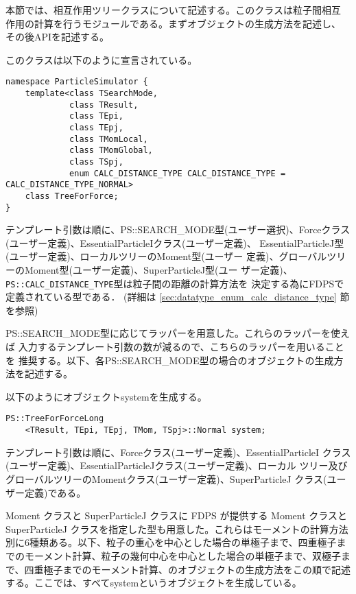 本節では、相互作用ツリークラスについて記述する。このクラスは粒子間相互
作用の計算を行うモジュールである。まずオブジェクトの生成方法を記述し、
その後APIを記述する。

\label{sec:module_standard_treeforce_object}
このクラスは以下のように宣言されている。
\begin{lstlisting}[caption=TreeForForce0]
namespace ParticleSimulator {
    template<class TSearchMode,
             class TResult,
             class TEpi,
             class TEpj,
             class TMomLocal,
             class TMomGlobal,
             class TSpj,
             enum CALC_DISTANCE_TYPE CALC_DISTANCE_TYPE = CALC_DISTANCE_TYPE_NORMAL>
    class TreeForForce;
}
\end{lstlisting}

テンプレート引数は順に、PS::SEARCH\_MODE型(ユーザー選択)、Forceクラス
(ユーザー定義)、EssentialParticleIクラス(ユーザー定義)、
EssentialParticleJ型(ユーザー定義)、ローカルツリーのMoment型(ユーザー
定義)、グローバルツリーのMoment型(ユーザー定義)、SuperParticleJ型(ユー
ザー定義)、{\tt PS::CALC\_DISTANCE\_TYPE}型は粒子間の距離の計算方法を
決定する為にFDPSで定義されている型である．
(詳細は \ref{sec:datatype_enum_calc_distance_type} 節を参照)

PS::SEARCH\_MODE型に応じてラッパーを用意した。これらのラッパーを使えば
入力するテンプレート引数の数が減るので、こちらのラッパーを用いることを
推奨する。以下、各PS::SEARCH\_MODE型の場合のオブジェクトの生成方法を記述する。

\label{sec:module_treeforce_standard_search_mode_long}

以下のようにオブジェクトsystemを生成する。
\begin{screen}
\begin{verbatim}
PS::TreeForForceLong
    <TResult, TEpi, TEpj, TMom, TSpj>::Normal system;
\end{verbatim}
\end{screen}
テンプレート引数は順に、Forceクラス(ユーザー定義)、EssentialParticleI
クラス(ユーザー定義)、EssentialParticleJクラス(ユーザー定義)、ローカル
ツリー及びグローバルツリーのMomentクラス(ユーザー定義)、SuperParticleJ
クラス(ユーザー定義)である。

Moment クラスと SuperParticleJ クラスに FDPS が提供する Moment クラスと SuperParticleJ クラスを指定した型も用意した。これらはモーメントの計算方法別に6種類ある。以下、粒子の重心を中心とした場合の単極子まで、四重極子までのモーメント計算、粒子の幾何中心を中心とした場合の単極子まで、双極子まで、四重極子までのモーメント計算、のオブジェクトの生成方法をこの順で記述する。ここでは、すべてsystemというオブジェクトを生成している。

